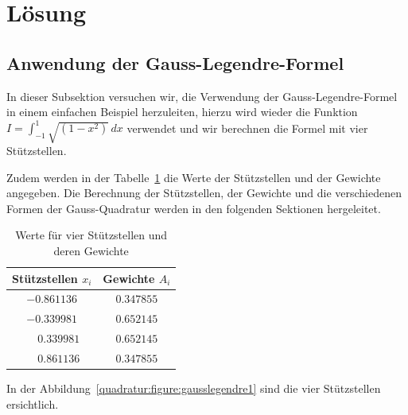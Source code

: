 %
%
%
\section{Lösung
\label{quadratur:section:loesung}}
\subsection{Anwendung der Gauss-Legendre-Formel
\label{quadratur:subsection:gausslegendreanwendung}}
In dieser Subsektion versuchen wir, die Verwendung der Gauss-Legendre-Formel in einem
einfachen Beispiel herzuleiten, hierzu wird wieder die Funktion  
$I = \int_{-1}^{1}\sqrt{(1-x^2)}\,dx$ verwendet und 
wir berechnen die Formel mit vier Stützstellen.
\newline

Zudem werden in der Tabelle~\ref{buch:table:gaussbeispielwerte} die Werte der 
Stützstellen und der Gewichte angegeben. Die Berechnung der Stützstellen, der Gewichte
und die verschiedenen Formen der Gauss-Quadratur werden in den folgenden Sektionen 
hergeleitet.

\begin{table}[h!]
    \centering
    \begin{tabular}{|c|c|}
        \hline
        Stützstellen $x_{i}$ & Gewichte $A_{i}$ \\
        \hline
        $-0.861136 $ & $ 0.347855 $ \\
        $-0.339981 $ & $ 0.652145 $ \\
        $\phantom{-} 0.339981 $ & $ 0.652145 $ \\
        $\phantom{-} 0.861136 $ & $ 0.347855 $ \\
        \hline
    \end{tabular}
    \caption{Werte für vier Stützstellen und deren Gewichte
    \label{buch:table:gaussbeispielwerte}}    
\end{table}

\noindent
In der Abbildung~\ref{quadratur:figure:gausslegendre1} sind die vier Stützstellen 
ersichtlich.

